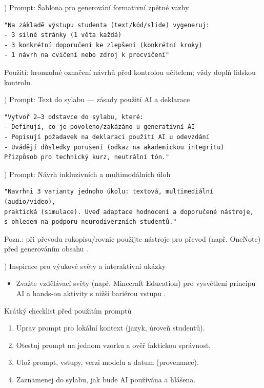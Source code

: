 \medskip
{}) Prompt: Šablona pro generování formativní zpětné vazby
\begin{verbatim}
"Na základě výstupu studenta (text/kód/slide) vygeneruj:
- 3 silné stránky (1 věta každá)
- 3 konkrétní doporučení ke zlepšení (konkrétní kroky)
- 1 návrh na cvičení nebo zdroj k procvičení"
\end{verbatim}
Použití: hromadné označení návrhů před kontrolou učitelem; vždy doplň lidskou kontrolu.

\medskip
{}) Prompt: Text do sylabu — zásady použití AI a deklarace
\begin{verbatim}
"Vytvoř 2–3 odstavce do sylabu, které:
- Definují, co je povoleno/zakázáno u generativní AI
- Popisují požadavek na deklaraci použití AI u odevzdání
- Uvádějí důsledky porušení (odkaz na akademickou integritu)
Přizpůsob pro technický kurz, neutrální tón."
\end{verbatim}

\medskip
{}) Prompt: Návrh inkluzivních a multimodálních úloh
\begin{verbatim}
"Navrhni 3 varianty jednoho úkolu: textová, multimediální (audio/video),
praktická (simulace). Uveď adaptace hodnocení a doporučené nástroje,
s ohledem na podporu neurodiverzních studentů."
\end{verbatim}
Pozn.: při převodu rukopisu/rovnic použijte nástroje pro převod (např. OneNote) před generováním obsahu \cite{kb_ai_101_tipu_pdf_04e4a115_page_8_1}.

\medskip
{}) Inspirace pro výukové světy a interaktivní ukázky
\begin{itemize}
  \item Zvažte vzdělávací světy (např. Minecraft Education) pro vysvětlení principů AI a hands‑on aktivity s nižší bariérou vstupu \cite{kb_ai_101_tipu_pdf_04e4a115_page_15_2}.
\end{itemize}

\bigskip
\noindent Krátký checklist před použitím promptů
\begin{enumerate}
  \item Uprav prompt pro lokální kontext (jazyk, úroveň studentů).
  \item Otestuj prompt na jednom vzorku a ověř faktickou správnost.
  \item Ulož prompt, vstupy, verzi modelu a datum (provenance).
  \item Zaznamenej do sylabu, jak bude AI používána a hlášena.
\end{enumerate}

